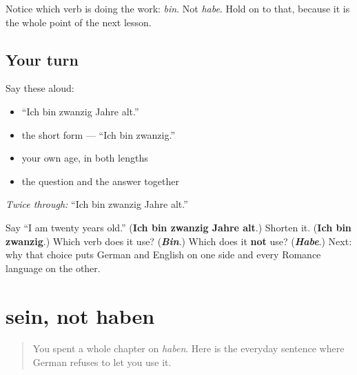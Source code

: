 Notice which verb is doing the work: \emph{bin}. Not \emph{habe}. Hold on to that, because it is the whole point of the next lesson.

\subsection*{Your turn}
Say these aloud:

\begin{itemize}
\raggedright
  \item \textquotedblleft{}Ich bin zwanzig Jahre alt.\textquotedblright{}
  \item the short form — \textquotedblleft{}Ich bin zwanzig.\textquotedblright{}
  \item your own age, in both lengths
  \item the question and the answer together
\end{itemize}

\emph{Twice through:} \textquotedblleft{}Ich bin zwanzig Jahre alt.\textquotedblright{}

\begin{tcolorbox}[breakable,colback=teal!4,colframe=teal!35!black,title={Before you move on}]
Say \textquotedblleft{}I am twenty years old.\textquotedblright{} (\textbf{Ich bin zwanzig Jahre alt}.) Shorten it. (\textbf{Ich bin zwanzig}.) Which verb does it use? (\emph{\textbf{Bin}}.) Which does it \textbf{not} use? (\emph{\textbf{Habe}}.) Next: why that choice puts German and English on one side and every Romance language on the other.
\end{tcolorbox}
\section[sein, nicht haben]{sein, not haben}

\label{lesson:GE-C14-alter-sein-haben}



\begin{quote}
You spent a whole chapter on \emph{haben}. Here is the everyday sentence where German refuses to let you use it.
\end{quote}

